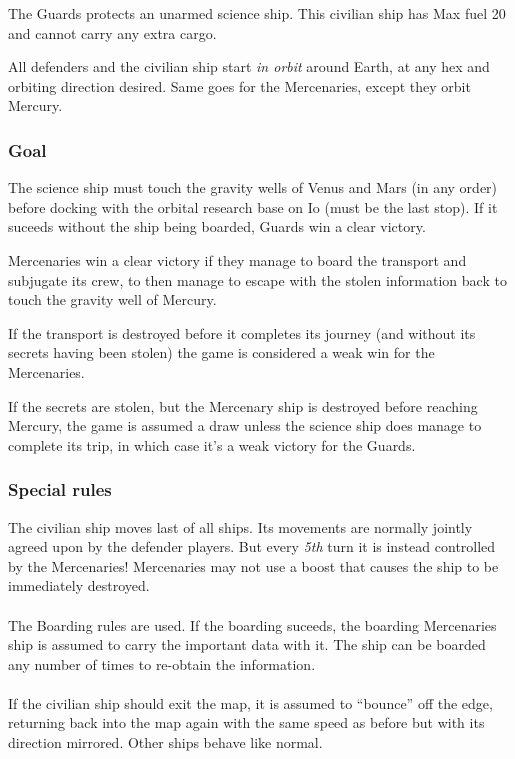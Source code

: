 \documentclass[a4paper,12pt,notitlepage,twocolumn]{article}
\begin{document}
The Guards protects an unarmed science ship. This civilian ship has
Max fuel 20 and cannot carry any extra cargo. 

All defenders and the civilian ship start \emph{in orbit} around Earth,
at any hex and orbiting direction desired. Same goes for the
Mercenaries, except they orbit Mercury.

\subsubsection*{Goal}

The science ship must touch the gravity wells of Venus and Mars (in
any order) before docking with the orbital research base on Io
(must be the last stop).  If it suceeds without the ship being
boarded, Guards win a clear victory. 

Mercenaries win a clear victory if they manage to board the transport
and subjugate its crew, to then manage to escape with the stolen information
back to touch the gravity well of Mercury. 

If the transport is destroyed before it completes its journey (and
without its secrets having been stolen) the game is considered a weak
win for the Mercenaries. 

If the secrets are stolen, but the Mercenary ship is destroyed before
reaching Mercury, the game is assumed a draw unless the science ship
does manage to complete its trip, in which case it's a weak victory
for the Guards.  

\subsubsection*{Special rules}

The civilian ship moves last of all ships. Its movements are normally jointly
agreed upon by the defender players. But every \emph{5th} turn it is instead
controlled by the Mercenaries! Mercenaries may not use a boost
that causes the ship to be immediately destroyed. 
\\\\
The Boarding rules are used. If the boarding suceeds, the boarding
Mercenaries ship is assumed to carry the important data with it. The
ship can be boarded any number of times to re-obtain the information. 
\\\\
If the civilian ship should exit the map, it is assumed to ``bounce''
off the edge, returning back into the map again with the same speed as
before but with its direction mirrored. Other ships behave like normal.
\end{document}
